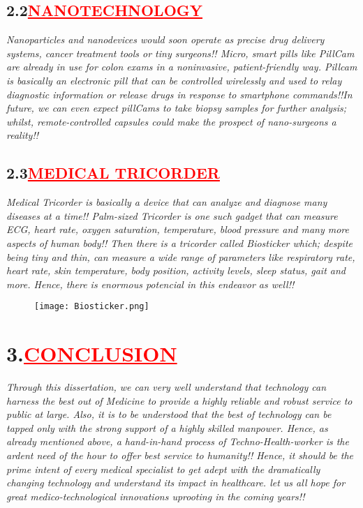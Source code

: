 \documentclass[12pt]{article}
\begin{document}
\subsection*{\textbf{\hspace{1cm}2.2\hspace{1cm}\textcolor{red}{\underline{\large{NANOTECHNOLOGY}}}}}

\hspace{1cm}\large{\emph{Nanoparticles and nanodevices would soon operate as precise drug delivery systems, cancer treatment tools or tiny surgeons!! Micro, smart pills like PillCam are already in use for colon exams in a noninvasive, patient-friendly way. Pillcam is basically an electronic pill that can be controlled wirelessly and used to relay diagnostic information or release drugs in response to smartphone commands!!In future, we can even expect pillCams to take biopsy samples for further analysis; whilst, remote-controlled capsules could make the prospect of nano-surgeons a reality!!}}

\subsection*{\textbf{\hspace{1cm}2.3\hspace{1cm}\textcolor{red}{\underline{\large{MEDICAL TRICORDER}}}}}
\hspace{1cm}\large{\emph{Medical Tricorder is basically a device that can analyze and diagnose many diseases at a time!! Palm-sized Tricorder is one such gadget that can measure ECG, heart rate, oxygen saturation, temperature, blood pressure and many more aspects of human body!! Then there is a tricorder called Biosticker which; despite being tiny and thin, can measure a wide range of parameters like respiratory rate, heart rate, skin temperature, body position, activity levels, sleep status, gait and more. Hence, there is enormous potencial in this endeavor as well!!}}
\begin{figure}
    \centering
    \texttt{[image: Biosticker.png]}
\end{figure}
\section*{\textbf{3.\hspace{1cm}\textcolor{red}{\underline{\huge{CONCLUSION}}}}}
\hspace{1cm}\large{\emph{Through this dissertation, we can very well understand that technology can harness the best out of Medicine to provide a highly reliable and robust service to public at large. Also, it is to be understood that the best of technology can be tapped only with the strong support of a highly skilled manpower. Hence, as already mentioned above, a hand-in-hand process of Techno-Health-worker is the ardent need of the hour to offer best service to humanity!! Hence, it should be the prime intent of every medical specialist to get adept with the dramatically changing technology and understand its impact in healthcare. let us all hope for great medico-technological innovations uprooting in the coming years!!}}
\end{document}
